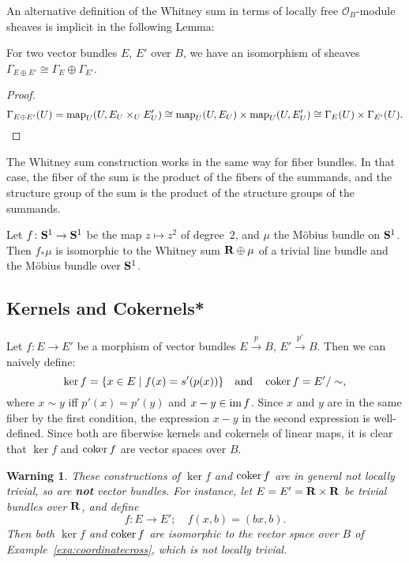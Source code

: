 \documentclass[a4paper,openany]{scrbook}
\newtheorem{warning}[equation]{Warning}
\begin{document}
An alternative definition of the Whitney sum in terms of locally free $\mathcal O_B$-module sheaves is implicit in the following Lemma:

\begin{lemma}
For two vector bundles $E$, $E'$ over $B$, we have an isomorphism of sheaves $\Gamma_{E \oplus E'} \cong \Gamma_E \oplus \Gamma_{E'}$.
\end{lemma}
\begin{proof}
\[
\Gamma_{E \oplus E'}(U) = \map_U(U,E_U \times_U E'_U) \cong \map_U(U,E_U) \times \map_U(U,E'_U) \cong \Gamma_E(U) \times \Gamma_{E'}(U).
\]
\end{proof}

The Whitney sum construction works in the same way for fiber bundles. In that case, the fiber of the sum is the product of the fibers of the summands, and the structure group of the sum is the product of the structure groups of the summands.

\begin{exer}
Let $f\colon \S^1 \to \S^1$ be the map $z \mapsto z^2$ of degree~$2$, and $\mu$ the Möbius bundle on $\S^1$. Then $f_*\mu$ is isomorphic to the Whitney sum $\R \oplus \mu$ of a trivial line bundle and the Möbius bundle over $\S^1$.
\end{exer}

\subsection{Kernels and Cokernels*}

Let $f\colon E \to E'$ be a morphism of vector bundles $E \xrightarrow{p} B$, $E' \xrightarrow{p'} B$. Then we can naively define:
\[
\ker f = \{x \in E \mid f(x)=s'(p(x))\} \quad \text{and} \quad \coker f = E'/\sim,
\]
where $x \sim y$ iff $p'(x) = p'(y)$ and $x-y \in \im f$. Since $x$ and $y$ are in the same fiber by the first condition, the expression $x-y$ in the second expression is well-defined. Since both are fiberwise kernels and cokernels of linear maps, it is clear that $\ker f$ and $\coker f$ are vector spaces over $B$.

\begin{warning}
These constructions of $\ker f$ and $\coker f$ are in general not locally trivial, so are \textbf{not} vector bundles. For instance, let $E=E'=\R\times \R$ be trivial bundles over $\R$, and define
\[
f\colon E \to E'; \quad f(x,b) = (bx,b).
\]
Then both $\ker f$ and $\coker f$ are isomorphic to the vector space over $B$ of Example~\ref{exa:coordinatecross}, which is not locally trivial.
\end{warning}
\end{document}
